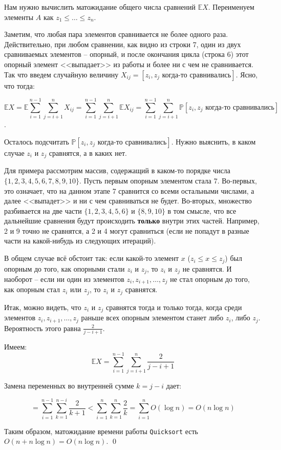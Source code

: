 Нам нужно вычислить матожидание общего числа сравнений $\mathbb E X$. Переименуем элементы $A$ как $z_1 \leq \ldots \leq z_n$.

Заметим, что любая пара элементов сравнивается не более одного раза. Действительно, при любом сравнении, как видно из строки 7, один из двух сравниваемых элементов -- опорный, и после окончания цикла (строка 6) этот опорный элемент <<выпадает>> из работы и более ни с чем не сравнивается. Так что введем случайную величину $X_{ij} = [z_i, z_j \text{ когда-то сравнивались}]$. Ясно, что тогда:

$$\mathbb E X = \mathbb E \sum_{i=1}^{n-1} \sum_{j=i+1}^n X_{ij} = \sum_{i=1}^{n-1} \sum_{j=i+1}^n \mathbb E X_{ij} = \sum_{i=1}^{n-1} \sum_{j=i+1}^n \mathbb P[z_i, z_j \text{ когда-то сравнивались}]$$.

Осталось подсчитать $\mathbb P[z_i, z_j\text{ когда-то сравнивались}]$. Нужно выяснить, в каком случае $z_i$ и $z_j$ сравнятся, а в каких нет.

Для примера рассмотрим массив, содержащий в каком-то порядке числа $\{1,2,3,4,5,6,7,8,9,10\}$. Пусть первым опорным элементом стала 7. Во-первых, это означает, что на данном этапе 7 сравнится со всеми остальными числами, а далее <<выпадет>> и ни с чем сравниваться не будет. Во-вторых, множество разбивается на две части $\{1,2,3,4,5,6\}$ и $\{8,9,10\}$ в том смысле, что все дальнейшие сравнения будут происходить \textbf{только} внутри этих частей. Например, 2 и 9 точно не сравнятся, а 2 и 4 могут сравниться (если не попадут в разные части на какой-нибудь из следующих итераций). 

В общем случае всё обстоит так: если какой-то элемент $x$ ($z_i \leq x \leq z_j$) был опорным до того, как опорными стали $z_i$ и $z_j$, то $z_i$ и $z_j$ не сравнятся. И наоборот -- если ни один из элементов $z_i, z_{i+1},\ldots, z_j$ не стал опорным до того, как опорным стал $z_i$ или $z_j$, то $z_i$ и $z_j$ сравнятся.

Итак, можно видеть, что $z_i$ и $z_j$ сравнятся тогда и только тогда, когда среди элементов $z_i, z_{i+1}, \ldots, z_j$ раньше всех опорным элементом станет либо $z_i$, либо $z_j$. Вероятность этого равна $\frac{2}{j-i+1}$.

Имеем: $$\mathbb E X = \sum_{i=1}^{n-1} \sum_{j=i+1}^n \frac{2}{j-i+1}$$

Замена переменных во внутренней сумме $k = j-i$ дает:

$$ = \sum_{i=1}^{n-1} \sum_{k=1}^{n-i} \frac{2}{k+1} < \sum_{i=1}^n \sum_{k=1}^n \frac{2}{k} = \sum_{i=1}^n O(\log n) = O(n \log n)$$

Таким образом, матожидание времени работы \texttt{Quicksort} есть $O(n+n\log n) = O(n\log n)$. \qed